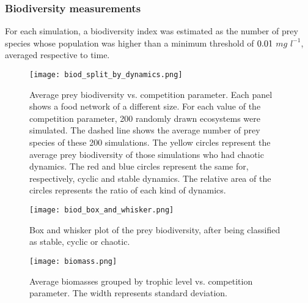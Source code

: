 \subsubsection{Biodiversity measurements}
\label{subsubsec:BiodiversityFigs}

For each simulation, a biodiversity index was estimated as the number of prey species whose population was higher than a minimum threshold of $0.01$ $mg$ $l^{-1}$, averaged respective to time.

\begin{figure}[H]
	\begin{center}
		\texttt{[image: biod\_split\_by\_dynamics.png]}
	\end{center}
	\caption{Average prey biodiversity vs. competition parameter. Each panel shows a food network of a different size. For each value of the competition parameter, 200 randomly drawn ecosystems were simulated. The dashed line shows the average number of prey species of these 200 simulations. The yellow circles represent the average prey biodiversity of those simulations who had chaotic dynamics. The red and blue circles represent the same for, respectively, cyclic and stable dynamics. The relative area of the circles represents the ratio of each kind of dynamics.}
	\label{fig:BiodSplitByChaos}
\end{figure}

\begin{figure}[H]
	\begin{center}
		\texttt{[image: biod\_box\_and\_whisker.png]}
	\end{center}
	\caption{Box and whisker plot of the prey biodiversity, after being classified as stable, cyclic or chaotic.}
	\label{fig:BiodBoxAndWhisker}
\end{figure}

\begin{figure}[H]
	\begin{center}
		\texttt{[image: biomass.png]}
	\end{center}
	\caption{Average biomasses grouped by trophic level vs. competition parameter. The width represents standard deviation.}
	\label{fig:Biomass}
\end{figure}
